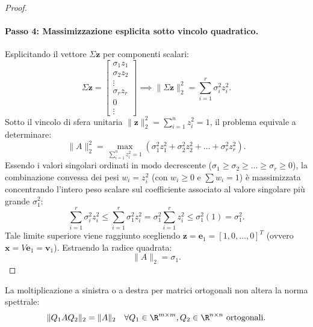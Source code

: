 \begin{proof}
\paragraph{Passo 4: Massimizzazione esplicita sotto vincolo quadratico.}
Esplicitando il vettore $\Sigma \mathbf{z}$ per componenti scalari:
\begin{equation}
    \Sigma \mathbf{z} = \begin{bmatrix} \sigma_1 z_1 \\ \sigma_2 z_2 \\ \vdots \\ \sigma_r z_r \\ 0 \\ \vdots \end{bmatrix} \implies \|\Sigma \mathbf{z}\|_2^2 = \sum_{i=1}^r \sigma_i^2 z_i^2.
\end{equation}
Sotto il vincolo di sfera unitaria $\|\mathbf{z}\|_2^2 = \sum_{i=1}^n z_i^2 = 1$, il problema equivale a determinare:
\begin{equation}
    \|A\|_2^2 = \max_{\sum_{i=1}^n z_i^2 = 1} \left( \sigma_1^2 z_1^2 + \sigma_2^2 z_2^2 + \dots + \sigma_r^2 z_r^2 \right).
\end{equation}
Essendo i valori singolari ordinati in modo decrescente ($\sigma_1 \ge \sigma_2 \ge \dots \ge \sigma_r \ge 0$), la combinazione convessa dei pesi $w_i = z_i^2$ (con $w_i \ge 0$ e $\sum w_i = 1$) \`e massimizzata concentrando l'intero peso scalare sul coefficiente associato al valore singolare pi\`u grande $\sigma_1^2$:
\begin{equation}
    \sum_{i=1}^r \sigma_i^2 z_i^2 \le \sum_{i=1}^r \sigma_1^2 z_i^2 = \sigma_1^2 \sum_{i=1}^r z_i^2 \le \sigma_1^2 (1) = \sigma_1^2.
\end{equation}
Tale limite superiore viene raggiunto scegliendo $\mathbf{z} = \mathbf{e}_1 = [1, 0, \dots, 0]^T$ (ovvero $\mathbf{x} = V \mathbf{e}_1 = \mathbf{v}_1$). Estraendo la radice quadrata:
\begin{equation}
    \|A\|_2 = \sigma_1.
\end{equation}
\end{proof}

\begin{corollary}
La moltiplicazione a sinistra o a destra per matrici ortogonali non altera la norma spettrale:
\begin{equation}
    \|Q_1 A Q_2\|_2 = \|A\|_2 \quad \forall Q_1 \in \R^{m \times m}, Q_2 \in \R^{n \times n} \text{ ortogonali}.
\end{equation}
\end{corollary}

